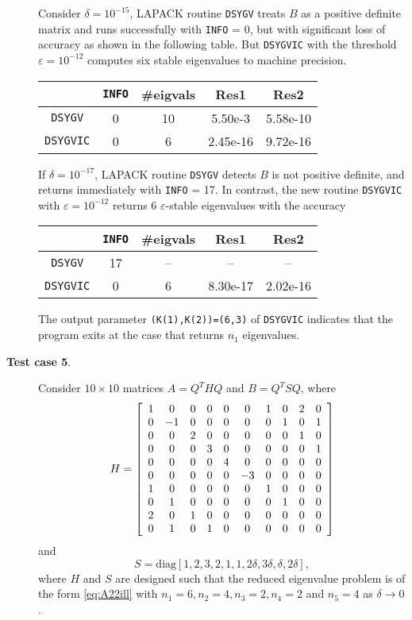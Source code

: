 \documentclass[11pt]{article}
\begin{document}
\begin{description}
Consider $\delta=10^{-15}$,
LAPACK routine {\tt DSYGV} treats $B$ as a positive definite matrix
and runs successfully with {\tt INFO} = 0, but with significant loss
of accuracy as shown in the following table.
But {\tt DSYGVIC} with the threshold $\varepsilon=10^{-12}$
computes six stable eigenvalues to machine precision.
\begin{center}
  \begin{tabular}{ c || c | c | c | c   }
                & {\tt INFO} & \#eigvals & Res1      & Res2     \\ \hline
    {\tt DSYGV}   &  0   &   10      & 5.50e-3   & 5.58e-10 \\
    {\tt DSYGVIC} &  0   &   6       & 2.45e-16  & 9.72e-16 \\
  \end{tabular}
\end{center}

If $\delta=10^{-17}$,
LAPACK routine {\tt DSYGV} detects $B$ is not positive definite, and 
returns immediately with {\tt INFO} = 17. 
In contrast, the new routine 
{\tt DSYGVIC} with $\varepsilon=10^{-12}$ returns 6 
$\varepsilon$-stable eigenvalues with the accuracy 
\begin{center}
  \begin{tabular}{ c || c | c | c | c } 
    		& {\tt INFO} & \#eigvals &   Res1    & Res2    \\ \hline
  {\tt  DSYGV}   &  17  &   --       &   --      &  --      \\
  {\tt  DSYGVIC} &  0   &   6        &  8.30e-17 & 2.02e-16 \\ 
  \end{tabular}
\end{center}
The output parameter {\tt (K(1),K(2))=(6,3)} of {\tt DSYGVIC} indicates that 
the program exits at the case that returns $n_1$ eigenvalues.
 
\item[{\bf Test case 5}.] 
Consider $10 \times 10$ matrices $A=Q^THQ$ and $B = Q^TSQ$, where 
\[
H=\left[\begin{array}{c c c c c c c c c c}
1 & 0 & 0 & 0 & 0 & 0 & 1 & 0 & 2 & 0 \\
0 &-1 & 0 & 0 & 0 & 0 & 0 & 1 & 0 & 1 \\
0 & 0 & 2 & 0 & 0 & 0 & 0 & 0 & 1 & 0 \\
0 & 0 & 0 & 3 & 0 & 0 & 0 & 0 & 0 & 1 \\
0 & 0 & 0 & 0 & 4 & 0 & 0 & 0 & 0 & 0 \\
0 & 0 & 0 & 0 & 0 &-3 & 0 & 0 & 0 & 0 \\
1 & 0 & 0 & 0 & 0 & 0 & 1 & 0 & 0 & 0 \\
0 & 1 & 0 & 0 & 0 & 0 & 0 & 1 & 0 & 0 \\
2 & 0 & 1 & 0 & 0 & 0 & 0 & 0 & 0 & 0 \\
0 & 1 & 0 & 1 & 0 & 0 & 0 & 0 & 0 & 0
\end{array}\right]
\]
and 
\[
S=\mbox{diag}[1,2,3,2,1,1,2\delta,3\delta,\delta,2\delta],
\]
where $H$ and $S$ are designed such that the reduced eigenvalue problem is 
of the form \eqref{eq:A22ill} with $n_1=6,n_2=4,n_3=2,n_4=2$ and $n_5=4$
as $\delta \rightarrow 0$.


\end{description}
\end{document}
